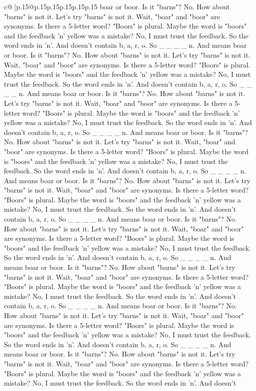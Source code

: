 \documentclass{article}
\begin{document}
{\begin{supertabular}{c@{$\;$}|p{.15\linewidth}@{}p{.15\linewidth}p{.15\linewidth}p{.15\linewidth}p{.15\linewidth}p{.15\linewidth}}
{{{boar or boor. Is it "barns"? No. How about "barns" is not it. Let's try "barns" is not it. Wait, "boar" and "boor" are synonyms. Is there a 5{-}letter word? "Boors" is plural. Maybe the word is "boors" and the feedback 'n' yellow was a mistake? No, I must trust the feedback. So the word ends in 'n'. And doesn't contain b, a, r, o. So \_ \_ \_ \_ n. And means boar or boor. Is it "barns"? No. How about "barns" is not it. Let's try "barns" is not it. Wait, "boar" and "boor" are synonyms. Is there a 5{-}letter word? "Boors" is plural. Maybe the word is "boors" and the feedback 'n' yellow was a mistake? No, I must trust the feedback. So the word ends in 'n'. And doesn't contain b, a, r, o. So \_ \_ \_ \_ n. And means boar or boor. Is it "barns"? No. How about "barns" is not it. Let's try "barns" is not it. Wait, "boar" and "boor" are synonyms. Is there a 5{-}letter word? "Boors" is plural. Maybe the word is "boors" and the feedback 'n' yellow was a mistake? No, I must trust the feedback. So the word ends in 'n'. And doesn't contain b, a, r, o. So \_ \_ \_ \_ n. And means boar or boor. Is it "barns"? No. How about "barns" is not it. Let's try "barns" is not it. Wait, "boar" and "boor" are synonyms. Is there a 5{-}letter word? "Boors" is plural. Maybe the word is "boors" and the feedback 'n' yellow was a mistake? No, I must trust the feedback. So the word ends in 'n'. And doesn't contain b, a, r, o. So \_ \_ \_ \_ n. And means boar or boor. Is it "barns"? No. How about "barns" is not it. Let's try "barns" is not it. Wait, "boar" and "boor" are synonyms. Is there a 5{-}letter word? "Boors" is plural. Maybe the word is "boors" and the feedback 'n' yellow was a mistake? No, I must trust the feedback. So the word ends in 'n'. And doesn't contain b, a, r, o. So \_ \_ \_ \_ n. And means boar or boor. Is it "barns"? No. How about "barns" is not it. Let's try "barns" is not it. Wait, "boar" and "boor" are synonyms. Is there a 5{-}letter word? "Boors" is plural. Maybe the word is "boors" and the feedback 'n' yellow was a mistake? No, I must trust the feedback. So the word ends in 'n'. And doesn't contain b, a, r, o. So \_ \_ \_ \_ n. And means boar or boor. Is it "barns"? No. How about "barns" is not it. Let's try "barns" is not it. Wait, "boar" and "boor" are synonyms. Is there a 5{-}letter word? "Boors" is plural. Maybe the word is "boors" and the feedback 'n' yellow was a mistake? No, I must trust the feedback. So the word ends in 'n'. And doesn't contain b, a, r, o. So \_ \_ \_ \_ n. And means boar or boor. Is it "barns"? No. How about "barns" is not it. Let's try "barns" is not it. Wait, "boar" and "boor" are synonyms. Is there a 5{-}letter word? "Boors" is plural. Maybe the word is "boors" and the feedback 'n' yellow was a mistake? No, I must trust the feedback. So the word ends in 'n'. And doesn't contain b, a, r, o. So \_ \_ \_ \_ n. And means boar or boor. Is it "barns"? No. How about "barns" is not it. Let's try "barns" is not it. Wait, "boar" and "boor" are synonyms. Is there a 5{-}letter word? "Boors" is plural. Maybe the word is "boors" and the feedback 'n' yellow was a mistake? No, I must trust the feedback. So the word ends in 'n'. And doesn't }}}
\end{supertabular}}
\end{document}
